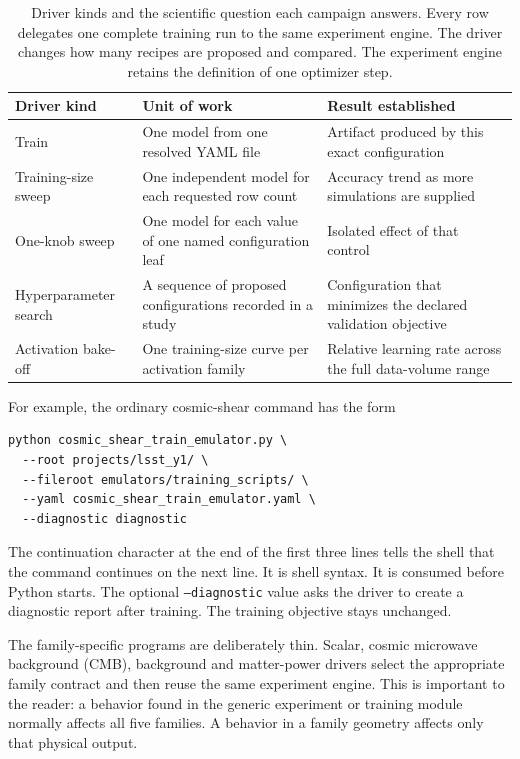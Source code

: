 \documentclass[10pt,aps,prd,twocolumn,nofootinbib]{revtex4-2}
\newcommand{\code}[1]{\texttt{#1}}
\begin{document}
\begin{table}[t]
\centering
\begin{tabular}{p{}p{}p{}}
\toprule
Driver kind & Unit of work & Result established \\
\midrule
Train & One model from one resolved YAML file & Artifact produced by this exact
configuration \\
Training-size sweep & One independent model for each requested row count &
Accuracy trend as more simulations are supplied \\
One-knob sweep & One model for each value of one named configuration leaf &
Isolated effect of that control \\
Hyperparameter search & A sequence of proposed configurations recorded in a
study & Configuration that minimizes the declared validation objective \\
Activation bake-off & One training-size curve per activation family & Relative
learning rate across the full data-volume range \\
\bottomrule
\end{tabular}
\caption{Driver kinds and the scientific question each campaign answers.
Every row delegates one complete training run to the same experiment engine.
The driver changes how many recipes are proposed and compared.  The experiment
engine retains the definition of one optimizer step.}
\label{tab:driver-kinds}
\end{table}

For example, the ordinary cosmic-shear command has the form
\begin{verbatim}
python cosmic_shear_train_emulator.py \
  --root projects/lsst_y1/ \
  --fileroot emulators/training_scripts/ \
  --yaml cosmic_shear_train_emulator.yaml \
  --diagnostic diagnostic
\end{verbatim}
The continuation character at the end of the first three lines tells the
shell that the command continues on the next line.  It is shell syntax.  It is
consumed before Python starts.  The optional \code{--diagnostic} value asks the driver
to create a diagnostic report after training.  The training objective stays
unchanged.

The family-specific programs are deliberately thin.  Scalar, cosmic
microwave background (CMB),
background and matter-power drivers select the appropriate family contract
and then reuse the same experiment engine.  This is important to the reader:
a behavior found in the generic experiment or training module normally
affects all five families.  A behavior in a family geometry affects only that
physical output.
\end{document}
